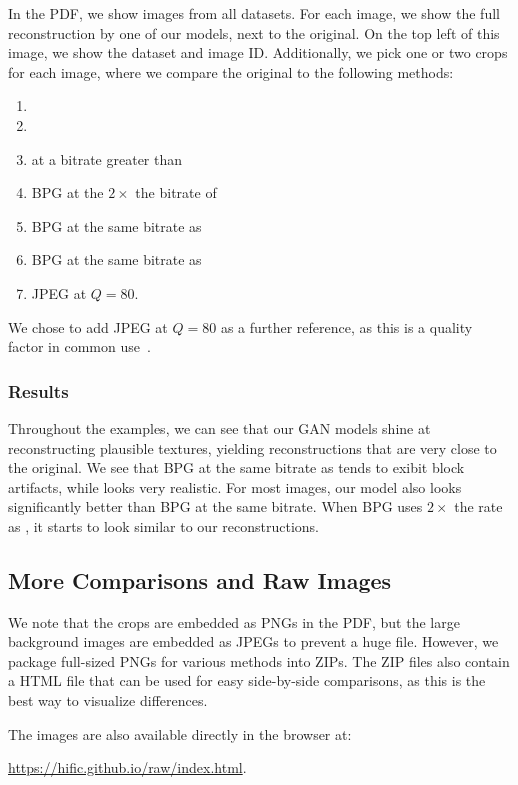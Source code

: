 \begin{subappendices}
In the PDF, we show images from all datasets. For each image, we show the full reconstruction by one of our models, next to the original. On the top left of this image, we show the dataset and image ID.
Additionally, we pick one or two crops for each image, where we compare the original to the following methods:
\begin{enumerate}[topsep=0pt]
    \item \nameoursmi
    \item \nameourslo
    \item \eblminnen at a bitrate greater than \enamelo
    \item BPG at the $2{\times}$ the bitrate of \enamemi
    \item BPG at the same bitrate as \enamemi
    \item BPG at the same bitrate as \enamelo
    \item JPEG at $Q=80$.
\end{enumerate}
We chose to add JPEG at $Q=80$ as a further reference, as this is a quality factor in common use~\cite{coulombe2009low}. 

\subsubsection*{Results}

Throughout the examples, we can see that our GAN models shine at reconstructing plausible textures, yielding reconstructions that are very close to the original. We see that BPG at the same bitrate as \enameourslo tends to exibit block artifacts, while \enamelo looks very realistic. For most images, our \enamemi model also looks significantly better than BPG at the same bitrate. When BPG uses $2{\times}$ the rate as \enamemi, it starts to look similar to our reconstructions. 


\subsection{More Comparisons and Raw Images}

We note that the crops are embedded as PNGs in the PDF, but the large background images are embedded as JPEGs to prevent a huge file. However, we package full-sized PNGs for various methods into ZIPs. The ZIP files also contain a HTML file that can be used for easy side-by-side comparisons, as this is the best way to visualize differences. 

The images are also available directly in the browser at:

\url{https://hific.github.io/raw/index.html}.
\end{subappendices}  
